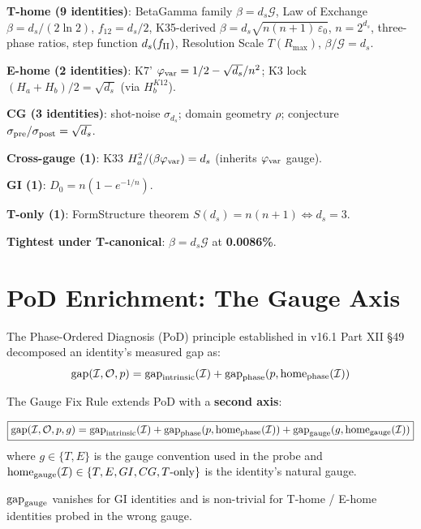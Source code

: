 \documentclass[12pt, a4paper]{article}
\begin{document}
\begin{keybox}[title={Reclassification Headlines}]
\textbf{T-home (9 identities)}: BetaGamma family $\beta = d_s\mathcal{G}$,
Law of Exchange $\beta = d_s/(2\ln 2)$, $f_{12} = d_s/2$, K35-derived
$\beta = d_s\sqrt{n(n+1)\,\varepsilon_0}$, $n = 2^{d_s}$, three-phase ratios,
step function $d_s(f_{\rm II})$, Resolution Scale $T(R_{\max})$, $\beta/\mathcal{G} = d_s$.

\textbf{E-home (2 identities)}: K7' $\varphi_{\rm var} = 1/2 - \sqrt{d_s}/n^2$;
K3 lock $(H_a + H_b)/2 = \sqrt{d_s}$ (via $H_b^{K12}$).

\textbf{CG (3 identities)}: shot-noise $\sigma_{d_s}$; domain geometry $\rho$;
conjecture $\sigma_{\rm pre}/\sigma_{\rm post} = \sqrt{d_s}$.

\textbf{Cross-gauge (1)}: K33 $H_a^2/(\beta\varphi_{\rm var}) = d_s$
(inherits $\varphi_{\rm var}$ gauge).

\textbf{GI (1)}: $D_0 = n(1-e^{-1/n})$.

\textbf{T-only (1)}: FormStructure theorem $S(d_s) = n(n+1) \iff d_s = 3$.

\textbf{Tightest under T-canonical}: $\beta = d_s\mathcal{G}$ at \textbf{0.0086\%}.
\end{keybox}

\section{PoD Enrichment: The Gauge Axis}

The Phase-Ordered Diagnosis (PoD) principle established in v16.1 Part XII §49
decomposed an identity's measured gap as:
\[
  \text{gap}(\mathcal{I}, \mathcal{O}, p) = \text{gap}_{\rm intrinsic}(\mathcal{I})
  + \text{gap}_{\rm phase}(p, \text{home}_{\rm phase}(\mathcal{I}))
\]

The Gauge Fix Rule extends PoD with a \textbf{second axis}:

\begin{keybox}[title={PoD Enriched Decomposition (v17)}]
\[
  \boxed{\text{gap}(\mathcal{I}, \mathcal{O}, p, g) =
  \text{gap}_{\rm intrinsic}(\mathcal{I})
  + \text{gap}_{\rm phase}(p, \text{home}_{\rm phase}(\mathcal{I}))
  + \text{gap}_{\rm gauge}(g, \text{home}_{\rm gauge}(\mathcal{I}))}
\]
where $g \in \{T, E\}$ is the gauge convention used in the probe and
$\text{home}_{\rm gauge}(\mathcal{I}) \in \{T, E, GI, CG, T\text{-only}\}$ is the
identity's natural gauge.

$\text{gap}_{\rm gauge}$ vanishes for GI identities and is non-trivial for
T-home / E-home identities probed in the wrong gauge.
\end{keybox}
\end{document}
